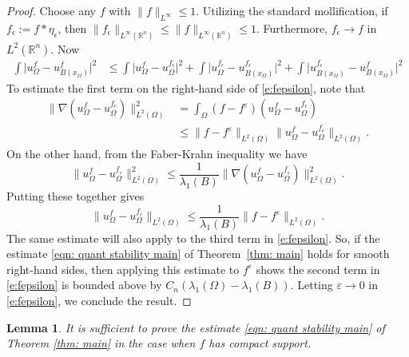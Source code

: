 \documentclass[10pt, reqno]{amsart}
\numberwithin{equation}{section}
\newtheorem{lemma}[theorem]{Lemma}
\def\e{\varepsilon}
\def\W{\Omega}
\begin{document}
 \begin{proof}
 Choose any $f$ with $\| f\|_{L^{\infty}} \leq 1$.
  Utilizing the standard mollification, if $f_{\epsilon} := f \ast \eta_{\epsilon}$, then 
  $\| f_{\epsilon} \|_{L^{\infty}(\mathbb{R}^n)} \leq \| f \|_{L^{\infty}(\mathbb{R}^n)} \leq 1$. Furthermore, $f_{\epsilon} \to f$ in $L^2(\mathbb{R}^n)$. Now 
  \begin{equation} \label{e:fepsilon}
  \begin{split}
    \int \big|u_{\W}^f- u_{B(x_{\W})}^f \big|^2
    &\leq \int \big|u_{\W}^f- u_{\W}^{f_{\epsilon}} \big|^2 + \int \big|u_{\W}^{f_{\epsilon}}- u_{B(x_{\W})}^{f_{\epsilon}} \big|^2  
    + \int \big|u_{B(x_{\W})}^{f_{\epsilon}}- u_{B(x_{\W})}^f \big|^2 
    \end{split}
  \end{equation}
To estimate the first term on the right-hand side of \eqref{e:fepsilon}, note that
  \[
   \begin{aligned}
       \| \nabla (u_{\W}^f- u_{\W}^{f_{\epsilon}}) \|^2_{L^2(\W)}
       &= \int_{\W} (f-f^{\e})(u_{\W}^f- u_{\W}^{f_{\epsilon}}) \\
       &\leq \| f - f^{\e} \|_{L^2(\W)} \| u_{\W}^f- u_{\W}^{f_{\epsilon}}\|_{L^2(\W)}. 
   \end{aligned}
  \]
On the other hand, from the Faber-Krahn inequality we have 
  \[
  \| u_{\W}^f - u_{\W}^{f_{\e}} \|^2_{L^2(\W)} \leq \frac{1}{\lambda_1(B)} \|\nabla (u_{\W}^f - u_{\W}^{f_{\e}}) \|^2_{L^2(\W)}.
  \]
Putting these together gives 
  \[
  \| u_{\W}^f - u_{\W}^{f_{\e}} \|_{L^2(\W)} \leq \frac{1}{\lambda_1(B)} \| f - f^{\e} \|_{L^2(\W)}. 
  \]
  The same estimate will also apply to the third term in \eqref{e:fepsilon}. 
  So, if the estimate \eqref{eqn: quant stability main} of Theorem~\ref{thm: main} holds for smooth right-hand sides, then applying this estimate to $f^\e$ shows the second term in \eqref{e:fepsilon} is bounded above by $C_{n}(\lambda_1(\W) - \lambda_1(B))$.
  Letting $\e \to 0$ in \eqref{e:fepsilon}, we conclude the result.  
 \end{proof}



\begin{lemma}\label{lem:fcptspt}
    It is sufficient to prove  the estimate \eqref{eqn: quant stability main} of  Theorem \ref{thm: main} in the case when  $f$ has compact support.
\end{lemma}
%
%
\end{document}
